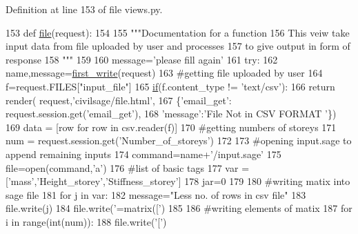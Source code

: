 Definition at line 153 of file views.\+py.


\begin{DoxyCode}
153 \textcolor{keyword}{def }\hyperlink{namespacecivilsage_1_1views_a32de127956738677913352a2db84ecdb}{file}(request):
154 
155     \textcolor{stringliteral}{"""Documentation for a function}
156 \textcolor{stringliteral}{    This veiw take input data from file uploaded by user and processes}
157 \textcolor{stringliteral}{    to give output in form of response}
158 \textcolor{stringliteral}{    """}
159 
160     message=\textcolor{stringliteral}{'please fill again'}
161     \textcolor{keywordflow}{try}:
162         name,message=\hyperlink{namespacecivilsage_1_1views_ad9397359f36a9df37e0aa43f3be032a3}{first\_write}(request)
163         \textcolor{comment}{#getting file uploaded by user}
164         f=request.FILES[\textcolor{stringliteral}{"input\_file"}]
165         \hyperlink{bootstrap_8min_8js_ac2d69f5011896c6ed4a54e0dd36f6334}{if}(f.content\_type != \textcolor{stringliteral}{'text/csv'}):
166             \textcolor{keywordflow}{return} render( request,\textcolor{stringliteral}{'civilsage/file.html'},
167             \{\textcolor{stringliteral}{'email\_get'}: request.session.get(\textcolor{stringliteral}{'email\_get'}),
168             \textcolor{stringliteral}{'message'}:\textcolor{stringliteral}{'File Not in CSV FORMAT '}\})
169         data = [row \textcolor{keywordflow}{for} row \textcolor{keywordflow}{in} csv.reader(f)]
170         \textcolor{comment}{#getting numbers of storeys}
171         num = request.session.get(\textcolor{stringliteral}{'Number\_of\_storeys'})
172 
173         \textcolor{comment}{#opening input.sage to append remaining inputs}
174         command=name+\textcolor{stringliteral}{'/input.sage'}
175         file=open(command,\textcolor{stringliteral}{'a'})
176         \textcolor{comment}{#list of basic tags}
177         var = [\textcolor{stringliteral}{'mass'},\textcolor{stringliteral}{'Height\_storey'},\textcolor{stringliteral}{'Stiffness\_storey'}]
178         jar=0
179 
180         \textcolor{comment}{#writing matix into sage file}
181         \textcolor{keywordflow}{for} j \textcolor{keywordflow}{in} var:
182             message=\textcolor{stringliteral}{"Less no. of rows in csv file"}
183             file.write(j)
184             file.write(\textcolor{stringliteral}{'=matrix(['})
185 
186             \textcolor{comment}{#writing elements of matix}
187             \textcolor{keywordflow}{for} i \textcolor{keywordflow}{in} range(int(num)):
188                 file.write(\textcolor{stringliteral}{'['})

\end{DoxyCode}
